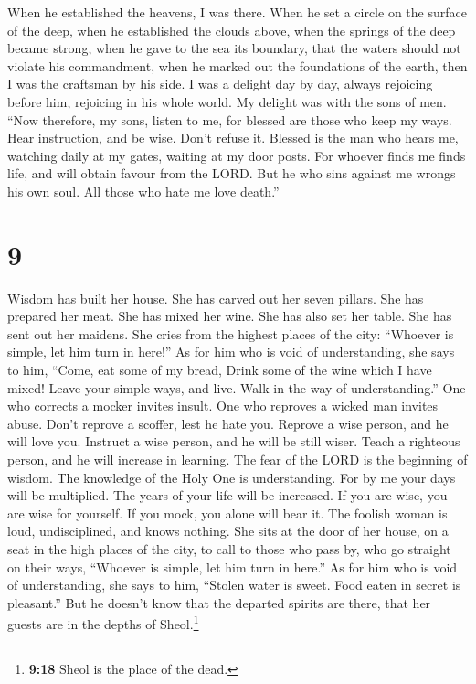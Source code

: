  When he established the heavens, I was there. When he
set a circle on the surface of the deep,  when he
established the clouds above, when the springs of the deep became
strong,  when he gave to the sea its boundary, that the
waters should not violate his commandment, when he marked out the
foundations of the earth,  then I was the craftsman by
his side. I was a delight day by day, always rejoicing before him,
 rejoicing in his whole world. My delight was with the
sons of men.  ``Now therefore, my sons, listen to me, for
blessed are those who keep my ways.  Hear instruction,
and be wise. Don't refuse it.  Blessed is the man who
hears me, watching daily at my gates, waiting at my door posts.
 For whoever finds me finds life, and will obtain favour
from the LORD.  But he who sins against me wrongs his own
soul. All those who hate me love death.''

\hypertarget{section-8}{%
\section{9}\label{section-8}}

 Wisdom has built her house. She has carved out her seven
pillars.  She has prepared her meat. She has mixed her
wine. She has also set her table.  She has sent out her
maidens. She cries from the highest places of the city: 
``Whoever is simple, let him turn in here!'' As for him who is void of
understanding, she says to him,  ``Come, eat some of my
bread, Drink some of the wine which I have mixed!  Leave
your simple ways, and live. Walk in the way of understanding.''
 One who corrects a mocker invites insult. One who
reproves a wicked man invites abuse.  Don't reprove a
scoffer, lest he hate you. Reprove a wise person, and he will love you.
 Instruct a wise person, and he will be still wiser. Teach
a righteous person, and he will increase in learning. 
The fear of the LORD is the beginning of wisdom. The knowledge of the
Holy One is understanding.  For by me your days will be
multiplied. The years of your life will be increased.  If
you are wise, you are wise for yourself. If you mock, you alone will
bear it.  The foolish woman is loud, undisciplined, and
knows nothing.  She sits at the door of her house, on a
seat in the high places of the city,  to call to those
who pass by, who go straight on their ways,  ``Whoever is
simple, let him turn in here.'' As for him who is void of understanding,
she says to him,  ``Stolen water is sweet. Food eaten in
secret is pleasant.''  But he doesn't know that the
departed spirits are there, that her guests are in the depths of
Sheol.\footnote{\textbf{9:18} Sheol is the place of the dead.}

